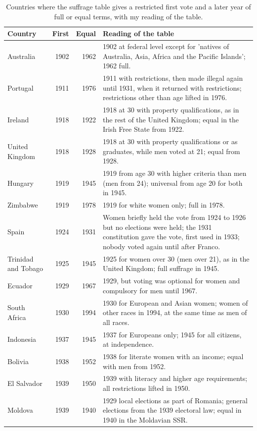 \documentclass[11pt,a4paper]{article}
\begin{document}
\begin{table}[tbp]\centering\footnotesize\caption{Countries where the suffrage table gives a restricted first vote and a later year of full or equal terms, with my reading of the table.}\label{tab:votes}\begin{tabular}{lrrp{9.6cm}}\toprule Country & First & Equal & Reading of the table\\\midrule
Australia & 1902 & 1962 & 1902 at federal level except for 'natives of Australia, Asia, Africa and the Pacific Islands'; 1962 full.\\
Portugal & 1911 & 1976 & 1911 with restrictions, then made illegal again until 1931, when it returned with restrictions; restrictions other than age lifted in 1976.\\
Ireland & 1918 & 1922 & 1918 at 30 with property qualifications, as in the rest of the United Kingdom; equal in the Irish Free State from 1922.\\
United Kingdom & 1918 & 1928 & 1918 at 30 with property qualifications or as graduates, while men voted at 21; equal from 1928.\\
Hungary & 1919 & 1945 & 1919 from age 30 with higher criteria than men (men from 24); universal from age 20 for both in 1945.\\
Zimbabwe & 1919 & 1978 & 1919 for white women only; full in 1978.\\
Spain & 1924 & 1931 & Women briefly held the vote from 1924 to 1926 but no elections were held; the 1931 constitution gave the vote, first used in 1933; nobody voted again until after Franco.\\
Trinidad and Tobago & 1925 & 1945 & 1925 for women over 30 (men over 21), as in the United Kingdom; full suffrage in 1945.\\
Ecuador & 1929 & 1967 & 1929, but voting was optional for women and compulsory for men until 1967.\\
South Africa & 1930 & 1994 & 1930 for European and Asian women; women of other races in 1994, at the same time as men of all races.\\
Indonesia & 1937 & 1945 & 1937 for Europeans only; 1945 for all citizens, at independence.\\
Bolivia & 1938 & 1952 & 1938 for literate women with an income; equal with men from 1952.\\
El Salvador & 1939 & 1950 & 1939 with literacy and higher age requirements; all restrictions lifted in 1950.\\
Moldova & 1939 & 1940 & 1929 local elections as part of Romania; general elections from the 1939 electoral law; equal in 1940 in the Moldavian SSR.\\

\end{tabular}
\end{table}
\end{document}
